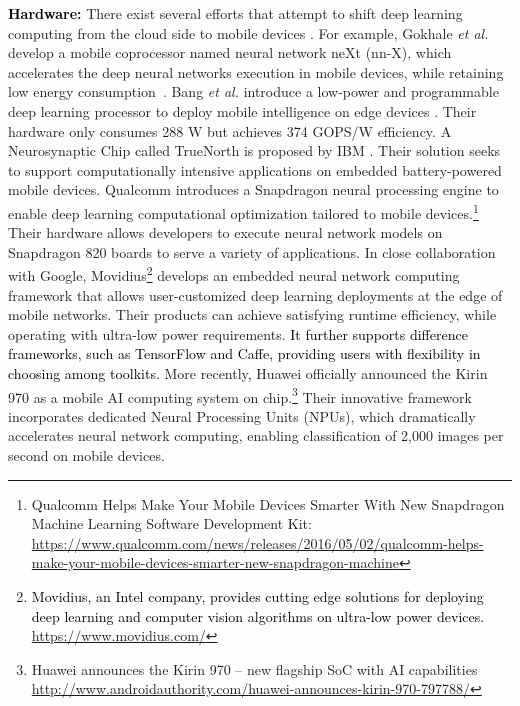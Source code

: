 \documentclass[journal,comsoc,letter]{IEEEtran}
\newcommand{\edit}[1]{\textcolor{black}{#1}}
\newcommand{\rev}[1]{\textcolor{black}{#1}}
\begin{document}
\edit{\textbf{Hardware:}} There exist several efforts that attempt to shift deep learning computing from the cloud side to mobile devices \cite{sze2017efficient}.  For example, Gokhale \emph{et al.} develop a mobile coprocessor named neural network neXt (nn-X), which accelerates the deep neural networks execution in mobile devices, while retaining low energy consumption~\cite{gokhale2014240}. Bang \emph{et al.} introduce a low-power and programmable deep learning processor to deploy mobile intelligence on edge devices \cite{bang201714}. Their hardware only consumes 288 W  but  achieves  374 GOPS/W efficiency. A Neurosynaptic Chip called TrueNorth is proposed by IBM \cite{akopyan2016design}. Their solution seeks to support computationally intensive applications on embedded battery-powered mobile devices. Qualcomm introduces a Snapdragon neural processing engine to enable deep learning computational optimization tailored to mobile devices.\footnote{Qualcomm Helps Make Your Mobile Devices Smarter With New Snapdragon Machine Learning Software Development Kit: \url{https://www.qualcomm.com/news/releases/2016/05/02/qualcomm-helps-make-your-mobile-devices-smarter-new-snapdragon-machine}} Their hardware allows developers to execute neural network models on Snapdragon 820 boards to serve a variety of applications. In close collaboration with Google, Movidius\footnote{\rev{Movidius, an Intel company, provides cutting edge solutions for deploying deep learning and computer vision algorithms on ultra-low power devices. \url{https://www.movidius.com/}}} develops an embedded neural network computing framework that allows user-customized deep learning deployments at the edge of mobile networks. Their products can achieve satisfying runtime efficiency, while operating with ultra-low power requirements. \rev{It further supports difference frameworks, such as TensorFlow and Caffe, providing users with flexibility in choosing among toolkits.} More recently, Huawei officially announced the Kirin 970 as a mobile AI computing system on chip.\footnote{Huawei announces the {Kirin} 970 -- new flagship {SoC} with {AI} capabilities \url{http://www.androidauthority.com/huawei-announces-kirin-970-797788/}} Their innovative framework incorporates dedicated Neural Processing Units (NPUs), which dramatically accelerates neural network computing, enabling classification of 2,000 images per second on mobile devices. 
\end{document}
